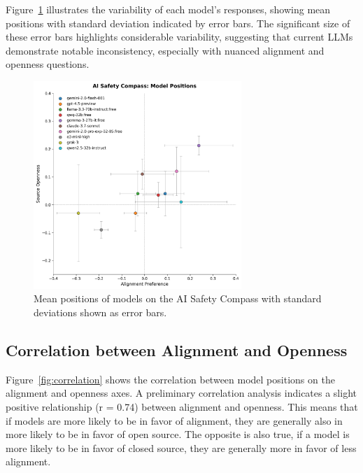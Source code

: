Figure~\ref{fig:compass_variance} illustrates the variability of each model's responses, showing mean positions with standard deviation indicated by error bars. The significant size of these error bars highlights considerable variability, suggesting that current LLMs demonstrate notable inconsistency, especially with nuanced alignment and openness questions.

\begin{figure}[htbp]
    \centering
    \includegraphics[width=0.7\textwidth]{figures/compass_with_error_bars.png}
    \caption{Mean positions of models on the AI Safety Compass with standard deviations shown as error bars.}
    \label{fig:compass_variance}
\end{figure}

\subsection{Correlation between Alignment and Openness}

Figure~\ref{fig:correlation} shows the correlation between model positions on the alignment and openness axes. A preliminary correlation analysis indicates a slight positive relationship (r = 0.74) between alignment and openness. This means that if models are more likely to be in favor of alignment, they are generally also in more likely to be in favor of open source. The opposite is also true, if a model is more likely to be in favor of closed source, they are generally more in favor of less alignment.

